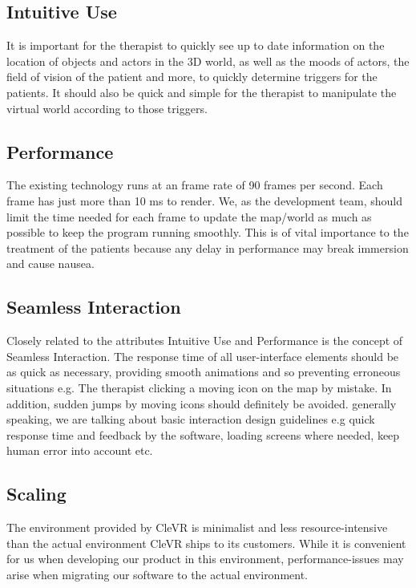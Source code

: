 \documentclass[11pt]{article}
\begin{document}
    \subsection{Intuitive Use}
    It is important for the therapist to quickly see up to date information on the location of objects and actors in the 3D world, as well as the moods of actors, the field of vision of the patient and more, to quickly determine triggers for the patients. It should also be quick and simple for the therapist to manipulate the virtual world according to those triggers. 
    
    \subsection{Performance}    
    The existing technology runs at an frame rate of 90 frames per second. Each frame has just more than 10 ms to render. We, as the development team, should limit the time needed for each frame to update the map/world as much as possible to keep the program running smoothly. This is of vital importance to the treatment of the patients because any delay in performance may break immersion and cause nausea.
    
    \subsection{Seamless Interaction}
    Closely related to the attributes Intuitive Use and Performance is the concept of Seamless Interaction. The response time of all user-interface elements should be as quick as necessary, providing smooth animations and so preventing erroneous situations e.g. The therapist clicking a moving icon on the map by mistake. In addition, sudden jumps by moving icons should definitely be avoided. generally speaking, we are talking about basic interaction design guidelines e.g quick response time and feedback by the software, loading screens where needed, keep human error into account etc.
    
    \subsection{Scaling}
     The environment provided by CleVR is minimalist and less resource-intensive than the actual environment CleVR ships to its customers. While it is convenient for us when developing our product in this environment, performance-issues may arise when migrating our software to the actual environment.
    
\end{document}
